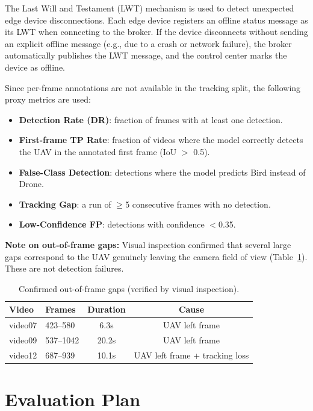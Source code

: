 \documentclass[12pt,a4paper]{report}
\begin{document}
The Last Will and Testament (LWT) mechanism is used to detect unexpected
edge device disconnections. Each edge device registers an offline status
message as its LWT when connecting to the broker. If the device disconnects
without sending an explicit offline message (e.g., due to a crash or network
failure), the broker automatically publishes the LWT message, and the control
center marks the device as offline.

Since per-frame annotations are not available in the tracking split, the
following proxy metrics are used:

\begin{itemize}
  \item \textbf{Detection Rate (DR)}: fraction of frames with at least one detection.
  \item \textbf{First-frame TP Rate}: fraction of videos where the model correctly
        detects the UAV in the annotated first frame (IoU $>$ 0.5).
  \item \textbf{False-Class Detection}: detections where the model predicts Bird
        instead of Drone.
  \item \textbf{Tracking Gap}: a run of $\geq$5 consecutive frames with no detection.
  \item \textbf{Low-Confidence FP}: detections with confidence $<$0.35.
\end{itemize}

\textbf{Note on out-of-frame gaps:} Visual inspection confirmed that several
large gaps correspond to the UAV genuinely leaving the camera field of view
(Table~\ref{tab:oof}). These are not detection failures.

\begin{table}[H]
\centering
\caption{Confirmed out-of-frame gaps (verified by visual inspection).}
\label{tab:oof}
\small
\begin{tabular}{|l|l|c|c|}
\hline
\textbf{Video} & \textbf{Frames} & \textbf{Duration} & \textbf{Cause} \\
\hline
video07 & 423--580  & 6.3s  & UAV left frame \\
\hline
video09 & 537--1042 & 20.2s & UAV left frame \\
\hline
video12 & 687--939  & 10.1s & UAV left frame + tracking loss \\
\hline
\end{tabular}
\end{table}

\section{Evaluation Plan}
\end{document}
